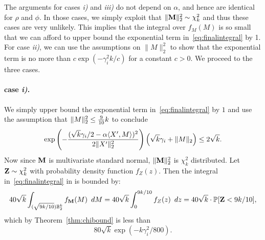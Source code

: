 The arguments for cases \textit{i)} and \textit{iii)} do not depend on $\alpha$, and hence are identical for $\rho$ and $\phi$. In those cases, we simply exploit that $\|\mathbf{M}\|_2^2 \sim \chi^2_k$ and thus these cases are very unlikely. This implies that the integral over $f_M(M)$ is so small that we can afford to upper bound the exponential term in~\eqref{eq:finalintegral} by 1. For case \textit{ii)}, we can use the assumptions on $\|M\|_2^2$ to show that the exponential term is no more than $c\exp(-\gamma_i^2 k/c)$ for a constant $c>0$. We proceed to the three cases.

\paragraph{case \textit{i)}.}
We simply upper bound the exponential term in~\eqref{eq:finalintegral} by $1$ and use the assumption that $\norm{M}_2^2\le \frac{9}{10}k$ to conclude
\begin{align*}
\exp\left(-\frac{(\sqrt{k}\gamma_i/2 - \alpha\ipr{X',M})^2}{2\norm{X'}_2^2}\right)\left(\sqrt{k}\gamma_i + \|M\|_2 \right)
\le 2\sqrt{k}.
\end{align*}
Now since $\mathbf{M}$ is multivariate standard normal, $\norm{\rM}_2^2$ is $\chi_k^2$ distributed. Let $\mathbf{Z} \sim \chi_k^2$ with probability density function $f_Z(z)$. Then the integral in~\eqref{eq:finalintegral} in is bounded by:
\begin{align*}
40\sqrt{k} \int_{(\sqrt{9 k/10})\mathbb{B}_2^k} f_{\mathbf{M}}(M)\enspace dM
= 40\sqrt{k} \int_0^{9 k/10} f_{Z}(z)\enspace dz 
= 40\sqrt{k} \cdot \mathbb{P}[\mathbf{Z}<9k/10],
\end{align*}
which by Theorem~\ref{thm:chibound} is less than
$$80\sqrt{k} \exp\left(-k\gamma_i^2/800\right).$$
